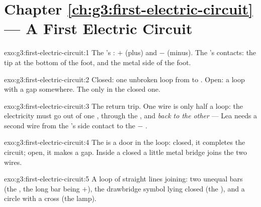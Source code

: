 \section*{Chapter \ref{ch:g3:first-electric-circuit} --- A First Electric Circuit}

\begin{solution}{exo:g3:first-electric-circuit:1}
The 's : $+$ (plus) and $-$ (minus). The 's
contacts: the tip at the bottom of the foot, and the metal side of
the foot.
\end{solution}

\begin{solution}{exo:g3:first-electric-circuit:2}
Closed: one unbroken loop from  to . Open: a loop
with a gap somewhere. The   only in the closed one.
\end{solution}

\begin{solution}{exo:g3:first-electric-circuit:3}
The return trip. One wire is only half a loop: the electricity must
go out of one , through the , and \emph{back to the
other } --- Lea needs a second wire from the 's side
contact to the $-$ .
\end{solution}

\begin{solution}{exo:g3:first-electric-circuit:4}
The  is a door in the loop: closed, it completes the circuit;
open, it makes a gap. Inside a closed  a little metal bridge
joins the two wires.
\end{solution}

\begin{solution}{exo:g3:first-electric-circuit:5}
A loop of straight lines joining: two unequal bars (the , the
long bar being $+$), the drawbridge symbol lying closed (the
), and a circle with a cross (the lamp).
\end{solution}

